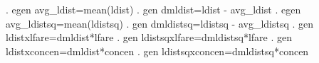 . egen avg_ldist=mean(ldist)
{\smallskip}
. gen dmldist=ldist - avg_ldist
{\smallskip}
. egen avg_ldistsq=mean(ldistsq)
{\smallskip}
. gen dmldistsq=ldistsq - avg_ldistsq
{\smallskip}
. gen ldistxlfare=dmldist*lfare
{\smallskip}
. gen ldistsqxlfare=dmldistsq*lfare
{\smallskip}
. gen ldistxconcen=dmldist*concen
{\smallskip}
. gen ldistsqxconcen=dmldistsq*concen
{\smallskip}
